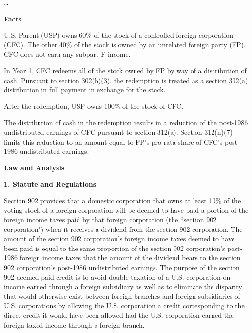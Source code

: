 \begin{select}
\ldots\\

\begin{center} \textbf{Facts}
\end{center}

U.S. Parent (USP) owns 60\% of the stock of a controlled foreign corporation (CFC). The other 40\% of the stock is owned by an unrelated foreign party (FP). CFC does not earn any subpart F income.

In Year 1, CFC redeems all of the stock owned by FP by way of a distribution of cash.  Pursuant to section 302(b)(3), the redemption is treated as a section 302(a) distribution in full payment in exchange for the stock.

After the redemption, USP owns 100\% of the stock of CFC.

The distribution of cash in the redemption results in a reduction of the post-1986 undistributed earnings of CFC pursuant to section 312(a). Section 312(n)(7) limits this reduction to an amount equal to FP's pro-rata share of CFC's post-1986 undistributed earnings.

\begin{center} \textbf{Law and Analysis}
\end{center}

\begin{center} \textbf{1.  Statute and Regulations}
\end{center}

Section 902 provides that a domestic corporation that owns at least 10\% of the voting stock of a foreign corporation will be deemed to have paid a portion of the foreign income taxes paid by that foreign corporation (the ``section 902 corporation") when it receives a dividend from the section 902 corporation. The amount of the section 902 corporation's foreign income taxes deemed to have been paid is equal to the same proportion of the section 902 corporation's post-1986 foreign income taxes  that the amount of the dividend bears to the section 902 corporation's post-1986 undistributed earnings. The purpose of the section 902 deemed paid credit is to avoid double taxation of a U.S. corporation on income earned through a foreign subsidiary as well as to eliminate the disparity that would otherwise exist between foreign branches and foreign subsidiaries of U.S. corporations by allowing the U.S. corporation a credit corresponding to the direct credit it would have been allowed had the U.S. corporation earned the foreign-taxed income through a foreign branch.  


\end{select}
